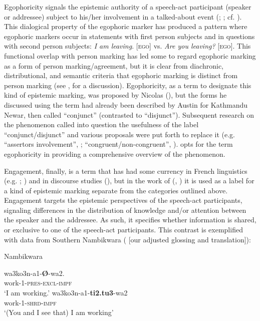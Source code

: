 \documentclass[output=paper]{langsci/langscibook}
\begin{document}
Egophoricity signals the epistemic authority of a speech-act participant (speaker or addressee) subject to his/her involvement in a talked-about event (\citealt{Bergqvist2018b}; \citealt{BergqvistKittila2017}; cf. \citealt{Hargreaves2005}). This dialogical property of the egophoric marker has produced a pattern where egophoric markers occur in statements with first person subjects and in questions with second person subjects: \textit{I am leaving}. [\textsc{ego}] vs. \textit{Are you leaving?} [\textsc{ego}]. This functional overlap with person marking has led some to regard egophoric marking as a form of person marking/agreement, but it is clear from diachronic, distributional, and semantic criteria that egophoric marking is distinct from person marking (see \citealt{BergqvistKittila2017}, for a discussion). Egophoricity, as a term to designate this kind of epistemic marking, was proposed by Nicolas \citeauthor{Tournadre1996} (\citeyear[201]{Tournadre1996}), but the forms he discussed using the term had already been described by Austin \cite{Hale1980} for Kathmandu Newar, then called “conjunct” (contrasted to “disjunct”). Subsequent research on the phenomenon called into question the usefulness of the label “conjunct/disjunct” and various proposals were put forth to replace it (e.g. “assertors involvement”, \citealt{Creissels2008}; “congruent/non-congruent”, \citealt{Dickinson2000}). \cite{SanRoqueetal2018} opts for the term egophoricity in providing a comprehensive overview of the phenomenon. 

Engagement, finally, is a term that has had some currency in French linguistics (e.g. \citealt{Descles2009}; \citealt{Guentcheva2011}) and in discourse studies (\citealt{Hyland2005}), but in the work of \citeauthor{Evansetal2017a} (\citeyear{Evansetal2017a}, \citeyear{Evansetal2017b}) it is used as a label for a kind of epistemic marking separate from the categories outlined above. Engagement targets the epistemic perspectives of the speech-act participants, signaling differences in the distribution of knowledge and/or attention between the speaker and the addressee. As such, it specifies whether information is shared, or exclusive to one of the speech-act participants. This contrast is exemplified with data from Southern Nambikwara (\citealt[63--64]{Kroeker2001} [our adjusted glossing and translation]):

\begin{exe}
\ex Nambikwara \label{ex:hb1}
	\begin{xlist}
	\ex 
	\gll wa3ko3n-a1-\textbf{Ø}-wa2.\\
	work-1-\textsc{pres}-\textsc{excl}-\textsc{impf}\\
	\trans ‘I am working.’ 
	\ex 
	\gll wa3ko3n-a1-\textbf{ti2.tu3}-wa2\\
	work-1-\textsc{shrd}-\textsc{impf}\\
	\trans ‘(You and I see that) I am working’ 	
	\end{xlist}
\end{exe}
\end{document}
